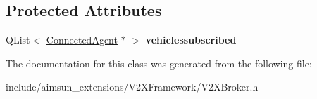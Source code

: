 \subsection*{Protected Attributes}
\begin{DoxyCompactItemize}
\item 
Q\+List$<$ \hyperlink{classConnectedAgent}{Connected\+Agent} $\ast$ $>$ {\bfseries vehiclessubscribed}\hypertarget{classV2XBroker_a2bdc4a1efb5b4dff5b29cca5a95a8e37}{}\label{classV2XBroker_a2bdc4a1efb5b4dff5b29cca5a95a8e37}

\end{DoxyCompactItemize}


The documentation for this class was generated from the following file\+:\begin{DoxyCompactItemize}
\item 
include/aimsun\+\_\+extensions/\+V2\+X\+Framework/V2\+X\+Broker.\+h\end{DoxyCompactItemize}
